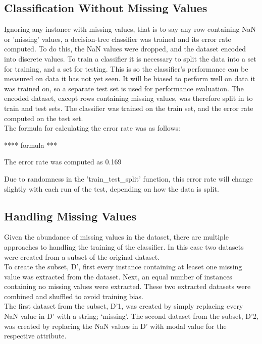 \documentclass{article}
\begin{document}
\subsection{Classification Without Missing Values}

Ignoring any instance with missing values, that is to say any row containing NaN or 'missing' values, a decision-tree classifier was trained
and its error rate computed. To do this, the NaN values were dropped, and the dataset encoded into discrete values. 
To train a classifier it is necessary to split the data into a set for training, and a set for testing. This is so the classifier's 
performance can be measured on data it has not yet seen. It will be biased to perform well on data it was trained on, so a separate 
test set is used for performance evaluation. 
The encoded dataset, except rows containing missing values, was therefore split in to train and test sets. The classifier was trained
on the train set, and the error rate computed on the test set.\\

The formula for calculating the error rate was as follows:

**** formula ***

The error rate was computed as 0.169

Due to randomness in the 'train\_test\_split' function, this error rate will change slightly with each run of the test, depending on
how the data is split. 



\subsection{Handling Missing Values}

Given the abundance of missing values in the dataset, there are multiple approaches to handling the training of the classifier. In this case
two datasets were created from a subset of the original dataset. \\

To create the subset, D', first every instance containing at leaset one missing value was extracted from the dataset. Next, an equal number of instances containing no
missing values were extracted. These two extracted datasets were combined and shuffled to avoid training bias. \\

The first dataset from the subset, D'1, was created by simply replacing every NaN value in D' with a string; `missing'.
The second dataset from the subset, D'2, was created by replacing the NaN values in D' with modal value for the respective attribute.\\
\end{document}
